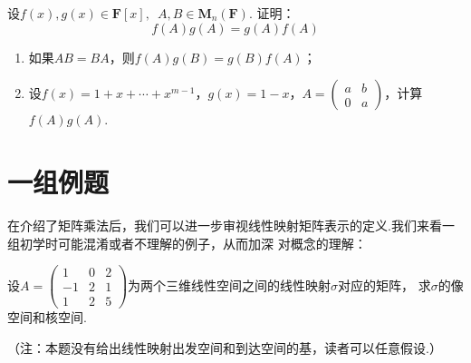 \begin{example}
    设$f(x),g(x) \in \mathbf{F}[x],\enspace A,B \in \mathbf{M}_n(\mathbf{F})$. 证明：
    \[f(A)g(A)=g(A)f(A)\]
    \begin{enumerate}
        \item 如果$AB=BA$，则$f(A)g(B)=g(B)f(A)$；

        \item 设$f(x)=1+x+\cdots+x^{m-1}$，$g(x)=1-x$，$A=\begin{pmatrix}
            a & b \\ 0 & a
        \end{pmatrix}$，计算$f(A)g(A)$.
    \end{enumerate}
\end{example}
\begin{solution}

\end{solution}

\section{一组例题}
在介绍了矩阵乘法后，我们可以进一步审视线性映射矩阵表示的定义.我们来看一组初学时可能混淆或者不理解的例子，从而加深
对概念的理解：
\begin{example}\label{ex:7:矩阵表示2}
    设$A=\begin{pmatrix}1 & 0 & 2 \\ -1 & 2 & 1 \\ 1 & 2 & 5\end{pmatrix}$为两个三维线性空间之间的线性映射$\sigma$对应的矩阵，
    求$\sigma$的像空间和核空间.
\end{example}
（注：本题没有给出线性映射出发空间和到达空间的基，读者可以任意假设.）

